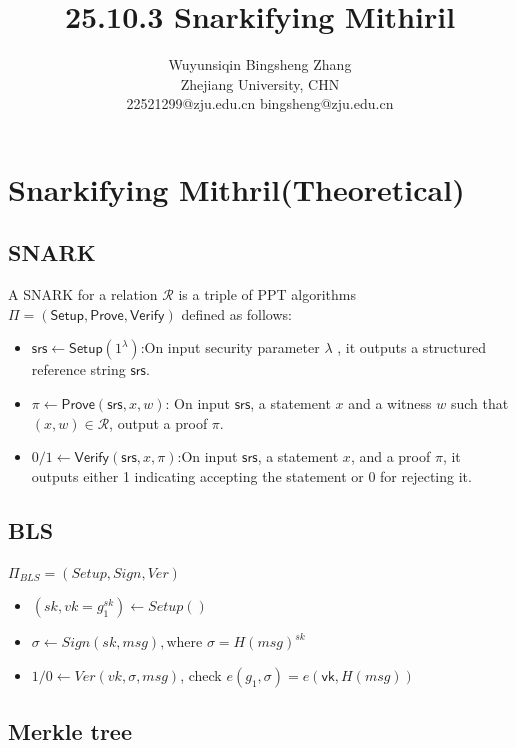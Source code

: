 \documentclass{article}
\title{25.10.3 Snarkifying Mithiril}
\author{Wuyunsiqin \quad \quad Bingsheng Zhang \\ 
Zhejiang University, CHN \\
22521299@zju.edu.cn \quad bingsheng@zju.edu.cn}
\begin{document}
\maketitle



\section{Snarkifying Mithril(Theoretical)}

\subsection{SNARK}
A SNARK for a relation $\mathcal{R}$ is a triple of PPT algorithms $\Pi = (\mathsf{Setup}, \mathsf{Prove}, \mathsf{Verify})$ defined as follows:


\begin{itemize}
    \item $  \mathsf{srs} \leftarrow \mathsf{Setup}(1^\lambda)$:On input security parameter $\lambda$
, it outputs a structured reference string $\mathsf{srs}$.   
    \item $\pi \leftarrow \mathsf{Prove}(\mathsf{srs}, x, w)$: On input $\mathsf{srs}$, a statement $x$ and a witness $w$ such that $(x, w) \in \mathcal{R}$, output a proof $\pi$.
    \item $0/1 \leftarrow\mathsf{Verify}(\mathsf{srs},x,\pi) $:On input $\mathsf{srs}$, a statement $x$, and a
proof $\pi$, it outputs either 1 indicating accepting the statement or 0 for rejecting it.
\end{itemize}

\subsection{BLS}
$\Pi_{BLS} = (Setup,Sign,Ver)$
\begin{itemize}
    \item $(sk,vk = g_1^{sk}) \leftarrow Setup() $
    \item $\sigma \leftarrow Sign(sk,msg), \text{where  }\sigma = H(msg)^{sk}$
    \item $1/0 \leftarrow Ver(vk,\sigma,msg)$, check $e(g_1, \sigma) = e(\mathsf{vk}, H(msg))$
\end{itemize}

\subsection{Merkle tree}
\end{document}
